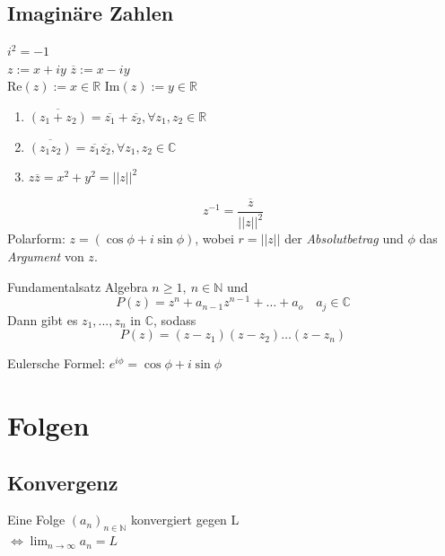 \documentclass[a4paper,fontsize = 7pt]{scrartcl}
\def\R{\mathbb{R}}
\begin{document}
\subsection{Imaginäre Zahlen}
\begin{center}
  $i^2 = -1$\\
  $z := x + iy$ \qquad $\overline{z} := x - iy$\\
  $\text{Re}(z) := x \in \R$ \qquad  $\text{Im}(z) := y \in \R$
\end{center}
\begin{subbox}{1.24}
  \vspace{-4pt}
    \begin{enumerate}
        \item $\overline{(z_1 + z_2)} = \overline{z_1} + \overline{z_2}, \forall z_1,z_2 \in \R$  
        \item $\overline{(z_1 z_2)} = \overline{z_1} \overline{z_2},  \forall z_1,z_2 \in \mathbb{C}$
        \item $z\overline{z} = x^2 + y^2 = ||z||^2$
    \end{enumerate}
    \vspace{-12pt}
\end{subbox}
\begin{equation*}
    z^{-1} = \frac{\overline{z}}{||z||^2}
\end{equation*}
Polarform: $z = ( \cos \phi + i \sin \phi)$, wobei $r = ||z||$ der \emph{Absolutbetrag} und $\phi$ das \emph{Argument} von $z$.
\begin{mainbox}{Fundamentalsatz Algebra}
  \vspace{-4pt}
    $n \geq 1,~n\in \mathbb{N}$ und 
    \begin{equation*}
        P(z) = z^n + a_{n-1} z^{n-1} + \ldots + a_o \quad a_j \in \mathbb{C}
    \end{equation*}
    Dann gibt es $z_1, ..., z_n$ in $\mathbb{C}$, sodass
    \begin{equation*}
        P(z) = (z - z_1)(z - z_2) \ldots(z-z_n)
    \end{equation*}
    \vspace{-16pt}
\end{mainbox}
Eulersche Formel: $e^{i\phi} = \cos \phi + i \sin \phi$

\section{Folgen}
\subsection{Konvergenz}
Eine Folge $(a_n)_{n\in \mathbb{N}}$ konvergiert gegen L \\ $\iff \lim_{n \to \infty} a_n = L $
\end{document}
